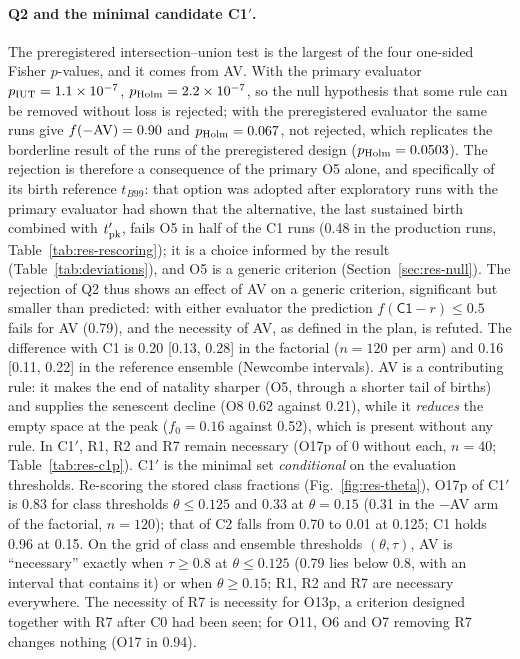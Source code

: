 \paragraph{Q2 and the minimal candidate \textsf{C1}$'$.}
The preregistered intersection--union test is the largest of the four one-sided Fisher $p$-values, and it comes
from AV. With the primary evaluator $p_{\rm IUT}=1.1\times10^{-7}$, $p_{\rm Holm}=2.2\times10^{-7}$, so the null
hypothesis that some rule can be removed without loss is rejected; with the preregistered evaluator the
same runs give $f(-{\rm AV})=0.90$ and $p_{\rm Holm}=0.067$, not rejected, which replicates the borderline result of
the runs of the preregistered design ($p_{\rm Holm}=0.0503$). The rejection is therefore a consequence of the primary O5 alone, and specifically
of its birth reference $t_{B99}$: that option was adopted after exploratory runs with the primary evaluator had
shown that the alternative, the last sustained birth combined with $t'_{\rm pk}$, fails O5 in half of the
\textsf{C1} runs (0.48 in the production runs, Table~\ref{tab:res-rescoring}); it is a choice informed by the result
(Table~\ref{tab:deviations}), and O5 is a generic criterion (Section~\ref{sec:res-null}). The rejection of Q2 thus
shows an effect of AV on a generic criterion, significant but smaller than predicted: with either evaluator the
prediction $f(\textsf{C1}-r)\le0.5$ fails for AV (0.79), and the necessity of AV, as defined in the plan, is refuted.
The difference with \textsf{C1} is 0.20 [0.13, 0.28] in the factorial ($n=120$ per arm) and 0.16 [0.11, 0.22] in
the reference ensemble (Newcombe intervals). AV is a contributing rule: it makes the end of natality sharper (O5,
through a shorter tail of births) and supplies the senescent decline (O8 0.62 against 0.21), while it \emph{reduces}
the empty space at the peak ($f_0=0.16$ against 0.52), which is present without any rule. In \textsf{C1}$'$, R1, R2
and R7 remain necessary (O17p of 0 without each, $n=40$; Table~\ref{tab:res-c1p}).
\textsf{C1}$'$ is the minimal set \emph{conditional} on the evaluation thresholds. Re-scoring the stored class
fractions (Fig.~\ref{fig:res-theta}), O17p of \textsf{C1}$'$ is 0.83 for class thresholds $\theta\le0.125$ and 0.33
at $\theta=0.15$ (0.31 in the $-$AV arm of the factorial, $n=120$); that of \textsf{C2} falls from 0.70 to 0.01 at
0.125; \textsf{C1} holds 0.96 at 0.15. On the grid of
class and ensemble thresholds $(\theta,\tau)$, AV is ``necessary'' exactly when $\tau\ge0.8$ at $\theta\le0.125$ (0.79
lies below 0.8, with an interval that contains it) or when $\theta\ge0.15$; R1, R2 and R7 are necessary everywhere.
The necessity of R7 is necessity for O13p, a criterion designed together with R7 after \textsf{C0} had been seen;
for O11, O6 and O7 removing R7 changes nothing (O17 in 0.94).

